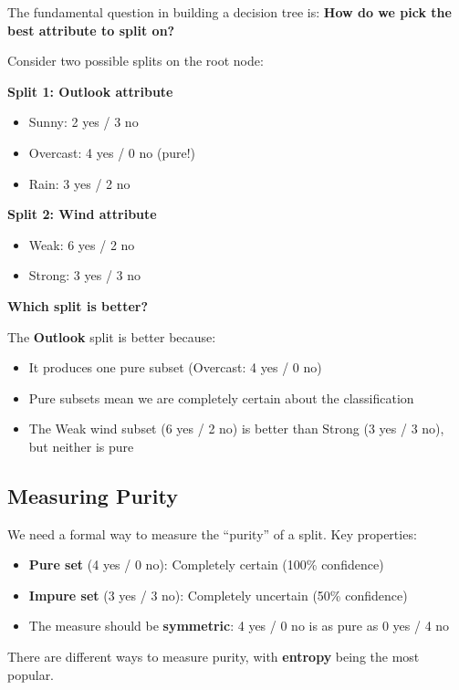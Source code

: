 \documentclass[11pt,a4paper]{article}
\theoremstyle{definition}
\theoremstyle{plain}
\theoremstyle{remark}
\begin{document}
The fundamental question in building a decision tree is: \textbf{How do we pick the best attribute to split on?}

Consider two possible splits on the root node:

\textbf{Split 1: Outlook attribute}
\begin{itemize}
    \item Sunny: 2 yes / 3 no
    \item Overcast: 4 yes / 0 no (pure!)
    \item Rain: 3 yes / 2 no
\end{itemize}

\textbf{Split 2: Wind attribute}
\begin{itemize}
    \item Weak: 6 yes / 2 no
    \item Strong: 3 yes / 3 no
\end{itemize}

\textbf{Which split is better?}

The \textbf{Outlook} split is better because:
\begin{itemize}
    \item It produces one pure subset (Overcast: 4 yes / 0 no)
    \item Pure subsets mean we are completely certain about the classification
    \item The Weak wind subset (6 yes / 2 no) is better than Strong (3 yes / 3 no), but neither is pure
\end{itemize}

\subsection{Measuring Purity}

We need a formal way to measure the ``purity'' of a split. Key properties:

\begin{itemize}
    \item \textbf{Pure set} (4 yes / 0 no): Completely certain (100\% confidence)
    \item \textbf{Impure set} (3 yes / 3 no): Completely uncertain (50\% confidence)
    \item The measure should be \textbf{symmetric}: 4 yes / 0 no is as pure as 0 yes / 4 no
\end{itemize}

There are different ways to measure purity, with \textbf{entropy} being the most popular.
\end{document}
